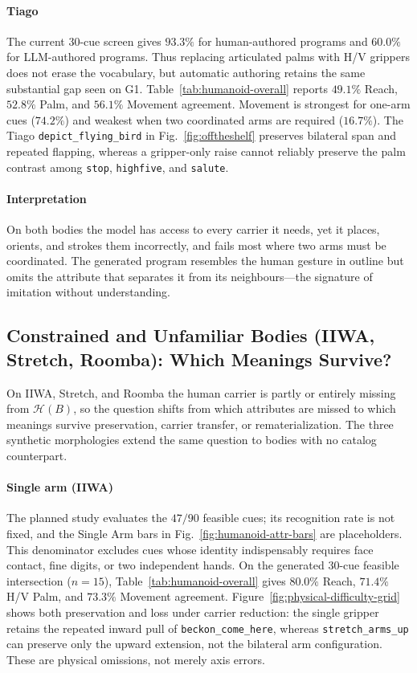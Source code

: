 \documentclass[letterpaper,10pt,conference]{ieeeconf}
\begin{document}
\paragraph{Tiago}
The current 30-cue screen gives $93.3\%$ for human-authored programs and $60.0\%$ for LLM-authored programs.
Thus replacing articulated palms with H/V grippers does not erase the vocabulary, but automatic authoring retains the same substantial gap seen on G1.
Table~\ref{tab:humanoid-overall} reports $49.1\%$ Reach, $52.8\%$ Palm, and $56.1\%$ Movement agreement.
Movement is strongest for one-arm cues ($74.2\%$) and weakest when two coordinated arms are required ($16.7\%$).
The Tiago \texttt{depict\_flying\_bird} in Fig.~\ref{fig:offtheshelf} preserves bilateral span and repeated flapping, whereas a gripper-only raise cannot reliably preserve the palm contrast among \texttt{stop}, \texttt{highfive}, and \texttt{salute}.

\paragraph{Interpretation}
On both bodies the model has access to every carrier it needs, yet it places, orients, and strokes them incorrectly, and fails most where two arms must be coordinated. The generated program resembles the human gesture in outline but omits the attribute that separates it from its neighbours---the signature of imitation without understanding.

\subsection{Constrained and Unfamiliar Bodies (IIWA, Stretch, Roomba): Which Meanings Survive?}
\label{sec:results-constrained}
On IIWA, Stretch, and Roomba the human carrier is partly or entirely missing from $\mathcal{H}(B)$, so the question shifts from which attributes are missed to which meanings survive preservation, carrier transfer, or rematerialization. The three synthetic morphologies extend the same question to bodies with no catalog counterpart.

\paragraph{Single arm (IIWA)}
The planned study evaluates the $47/90$ feasible cues; its recognition rate is not fixed, and the Single Arm bars in Fig.~\ref{fig:humanoid-attr-bars} are placeholders.
This denominator excludes cues whose identity indispensably requires face contact, fine digits, or two independent hands.
On the generated 30-cue feasible intersection ($n{=}15$), Table~\ref{tab:humanoid-overall} gives $80.0\%$ Reach, $71.4\%$ H/V Palm, and $73.3\%$ Movement agreement.
Figure~\ref{fig:physical-difficulty-grid} shows both preservation and loss under carrier reduction: the single gripper retains the repeated inward pull of \texttt{beckon\_come\_here}, whereas \texttt{stretch\_arms\_up} can preserve only the upward extension, not the bilateral arm configuration.
These are physical omissions, not merely axis errors.
\end{document}
